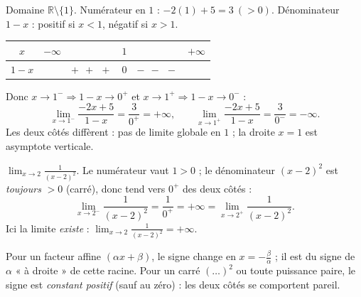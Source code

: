 \documentclass[11pt,a4paper]{article}
\newcommand{\R}{\mathbb{R}}
\begin{document}
\begin{exemple}
Domaine $\R\setminus\{1\}$. Numérateur en $1$ : $-2(1)+5=3\ (>0)$. Dénominateur $1-x$ : positif si
$x<1$, négatif si $x>1$.
\begin{center}
\renewcommand{\arraystretch}{1.25}
\begin{tabular}{c|ccccc}
\toprule
$x$ & $-\infty$ & & $1$ & & $+\infty$\\
\midrule
$1-x$ & & $+\ \ +\ \ +$ & $0$ & $-\ \ -\ \ -$ & \\
\bottomrule
\end{tabular}
\end{center}
Donc $x\to 1^{-}\Rightarrow 1-x\to 0^{+}$ et $x\to 1^{+}\Rightarrow 1-x\to 0^{-}$ :
\[ \lim_{x\to 1^{-}}\frac{-2x+5}{1-x}=\frac{3}{0^{+}}=+\infty,\qquad
   \lim_{x\to 1^{+}}\frac{-2x+5}{1-x}=\frac{3}{0^{-}}=-\infty. \]
Les deux côtés diffèrent : pas de limite globale en $1$ ; la droite $x=1$ est asymptote verticale.
\end{exemple}

\begin{exemple}
$\displaystyle\lim_{x\to 2}\frac{1}{(x-2)^2}$. Le numérateur vaut $1>0$ ; le dénominateur $(x-2)^2$
est \emph{toujours} $>0$ (carré), donc tend vers $0^{+}$ des deux côtés :
\[ \lim_{x\to 2^{-}}\frac{1}{(x-2)^2}=\frac{1}{0^{+}}=+\infty=\lim_{x\to 2^{+}}\frac{1}{(x-2)^2}. \]
Ici la limite \emph{existe} : $\displaystyle\lim_{x\to 2}\frac{1}{(x-2)^2}=+\infty$.
\end{exemple}

\begin{astuce}
Pour un facteur affine $(\alpha x+\beta)$, le signe change en $x=-\frac{\beta}{\alpha}$ ; il est du
signe de $\alpha$ « à droite » de cette racine. Pour un carré $(\dots)^2$ ou toute puissance paire,
le signe est \emph{constant positif} (sauf au zéro) : les deux côtés se comportent pareil.
\end{astuce}
\end{document}
